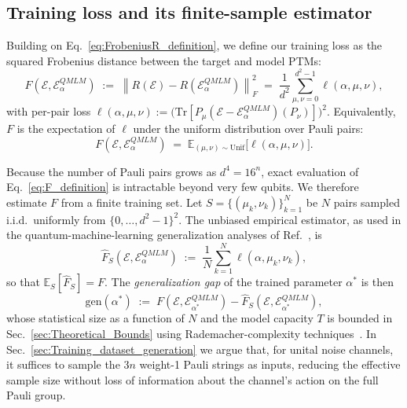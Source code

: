 \documentclass[%
 reprint,
superscriptaddress,
 amsmath,amssymb,
 aps,
]{revtex4-2}
\newcommand{\E}{\mathcal{E}}
\newcommand{\norm}[1]{\left\lVert#1\right\rVert}
\begin{document}
\subsection{Training loss and its finite-sample estimator}

Building on Eq.~\eqref{eq:FrobeniusR_definition}, we define our training loss as the squared Frobenius distance between the target and model PTMs:
\begin{equation}
    F(\E,\E^{QMLM}_\alpha) \;:=\; \norm{R(\E)-R(\E^{QMLM}_\alpha)}_F^2 \;=\; \frac{1}{d^2}\sum_{\mu,\nu=0}^{d^2-1}\ell(\alpha,\mu,\nu),
    \label{eq:F_definition}
\end{equation}
with per-pair loss $\ell(\alpha,\mu,\nu):=\bigl(\mathrm{Tr}[P_\mu(\E-\E^{QMLM}_\alpha)(P_\nu)]\bigr)^2$. Equivalently, $F$ is the expectation of $\ell$ under the uniform distribution over Pauli pairs:
\begin{equation}
    F(\E,\E^{QMLM}_\alpha) \;=\; \mathbb{E}_{(\mu,\nu)\sim\mathrm{Unif}}\bigl[\ell(\alpha,\mu,\nu)\bigr].
    \label{eq:F_as_expectation}
\end{equation}

Because the number of Pauli pairs grows as $d^4 = 16^n$, exact evaluation of Eq.~\eqref{eq:F_definition} is intractable beyond very few qubits. We therefore estimate $F$ from a finite training set. Let $S=\{(\mu_k,\nu_k)\}_{k=1}^{N}$ be $N$ pairs sampled i.i.d.\ uniformly from $\{0,\ldots,d^2-1\}^2$. The unbiased empirical estimator, as used in the quantum-machine-learning generalization analyses of Ref.~\cite{caro2022generalization}, is
\begin{equation}
    \widehat{F}_S(\E,\E^{QMLM}_\alpha) \;:=\; \frac{1}{N}\sum_{k=1}^N \ell(\alpha,\mu_k,\nu_k),
    \label{eq:F_hat_estimator}
\end{equation}
so that $\mathbb{E}_S[\widehat{F}_S]=F$. The \emph{generalization gap} of the trained parameter $\alpha^*$ is then
\begin{equation}
    \mathrm{gen}(\alpha^*) \;:=\; F(\E,\E^{QMLM}_{\alpha^*}) - \widehat{F}_S(\E,\E^{QMLM}_{\alpha^*}),
    \label{eq:gen_def}
\end{equation}
whose statistical size as a function of $N$ and the model capacity $T$ is bounded in Sec.~\ref{sec:Theoretical_Bounds} using Rademacher-complexity techniques~\cite{caro2022generalization}. In Sec.~\ref{sec:Training_dataset_generation} we argue that, for unital noise channels, it suffices to sample the $3n$ weight-1 Pauli strings as inputs, reducing the effective sample size without loss of information about the channel's action on the full Pauli group.
\end{document}
